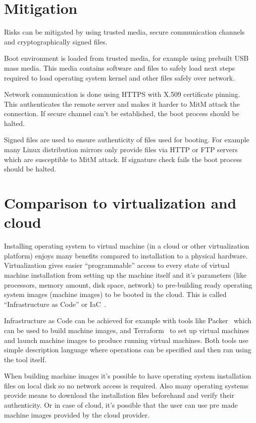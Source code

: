 \section{Mitigation}

Risks can be mitigated by using trusted media, secure communication
channels and cryptographically signed files.

Boot environment is loaded from trusted media, for example using
prebuilt USB mass media. This media contains software and files to
safely load next steps required to load operating system kernel and
other files safely over network.

Network communication is done using HTTPS with X.509 certificate
pinning. This authenticates the remote server and makes it harder to
MitM attack the connection. If secure channel can't be established,
the boot process should be halted.

Signed files are used to ensure authenticity of files used for
booting. For example many Linux distribution mirrors only provide
files via HTTP or FTP servers which are susceptible to MitM attack. If
signature check fails the boot process should be halted.


\section{Comparison to virtualization and cloud}

Installing operating system to virtual machine (in a cloud or other
virtualization platform) enjoys many benefits compared to installation
to a physical hardware. Virtualization gives easier ``programmable''
access to every state of virtual machine installation from setting up
the machine itself and it's parameters (like processors, memory
amount, disk space, network) to pre-building ready operating system
images (machine images) to be booted in the cloud. This is called
``Infrastructure as Code'' or IaC~\cite{spinellis}.

Infrastructure as Code can be achieved for example with tools like
Packer~\cite{packer} which can be used to build machine images, and
Terraform~\cite{terraform} to set up virtual machines and launch
machine images to produce running virtual machines. Both tools use
simple description language where operations can be specified and then
ran using the tool itself.

When building machine images it's possible to have operating system
installation files on local disk so no network access is
required. Also many operating systems provide means to download the
installation files beforehand and verify their authenticity. Or in
case of cloud, it's possible that the user can use pre made machine
images provided by the cloud provider.

